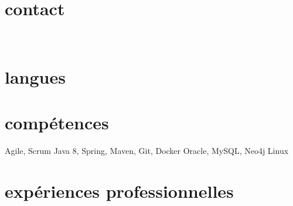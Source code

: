 \documentclass{friggeri-cv} 	%
\begin{document}


\begin{aside} %
\section{contact}
\myAddress
~
\myPhoneNumber
\myReferences
\section{langues}
\myLanguages
\section{compétences}
Agile, Scrum
Java 8, Spring,
Maven, Git, Docker
Oracle, MySQL, Neo4j
Linux
\end{aside}

\section{expériences professionnelles}
\end{document}
